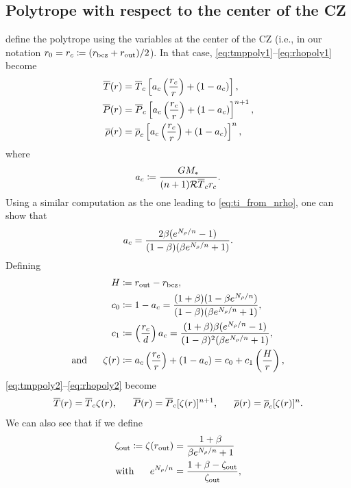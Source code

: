 \documentclass[12pt]{article}
\numberwithin{equation}{section}
\begin{document}
\subsection{Polytrope with respect to the center of the CZ}
\citet{Jones2011} define the polytrope using the variables at the center of the CZ (i.e., in our notation $r_0=r_c\coloneqq(r_{\rm{bcz}}+r_{\rm{out}})/2$). In that case, \eqref{eq:tmppoly1}--\eqref{eq:rhopoly1} become
\begin{align}
	\overline{T}(r) &= \overline{T}_c\left[a_c\left(\frac{r_c}{r}\right) + (1 - a_c)\right],\label{eq:tmppoly2}\\
	\overline{P}(r) &= \overline{P}_c\left[a_c\left(\frac{r_c}{r}\right) + (1 - a_c)\right]^{n+1},\label{eq:ppoly2}\\
	\overline{\rho}(r) &= \overline{\rho}_c\left[a_c\left(\frac{r_c}{r}\right) + (1 - a_c)\right]^n,\label{eq:rhopoly2}
\end{align} 
where 
\begin{align}
a_c \coloneqq \frac{GM_*}{(n+1)\mathcal{R} \overline{T}_c r_c}.
\label{eq:ac}
\end{align}
Using a similar computation as the one leading to \eqref{eq:ti_from_nrho}, one can show that 
\begin{align}
a_c = \frac{2\beta(e^{N_\rho/n}-1)}{(1-\beta)(\beta e^{N_\rho/n} + 1)}.
\label{eq:ac_fromn}
\end{align}
Defining 
\begin{align}
H&\coloneqq r_{\rm{out}}-r_{\rm{bcz}},\label{eq:d}\\
c_0&\coloneqq 1-a_c = \frac{(1+\beta)(1-\beta e^{N_\rho/n})}{(1-\beta)(\beta e^{N_\rho/n} + 1)}, \label{eq:c0}\\
c_1&\coloneqq \left(\frac{r_c}{d}\right)a_c = \frac{(1+\beta)\beta(e^{N_\rho/n}-1)}{(1-\beta)^2(\beta e^{N_\rho/n} + 1)},\label{eq:c1}\\
\text{and}\ \ \ \ \  \zeta(r) &\coloneqq a_c\left(\frac{r_c}{r}\right) + (1-a_c) = c_0 + c_1\left(\frac{H}{r}\right),\label{eq:zeta}
\end{align}
\eqref{eq:tmppoly2}--\eqref{eq:rhopoly2} become
\begin{align}
\tmpref\ofr=\tmpref_c\zeta(r),\ \ \ \ \ \prsref\ofr=\prsref_c[\zeta(r)]^{n+1},\ \ \ \ \ \rhoref\ofr=\rhoref_c[\zeta(r)]^n. 
\label{eq:polytrope3}
\end{align}
We can also see that if we define
\begin{subequations}
\begin{align}
\zeta_{\rm{out}} \coloneqq \zeta(r_{\rm{out}}) &= \frac{1+\beta}{\beta e^{N_\rho/n} + 1}\\
\text{with}\ \ \ \ \  e^{N_\rho/n}&=\frac{1+\beta-\zeta_{\rm{out}}}{\zeta_{\rm{out}}},
\end{align}
\end{subequations}
\end{document}
